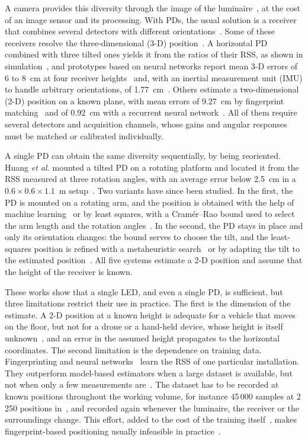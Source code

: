 A camera provides this diversity through the image of the luminaire~\cite{Hussain2022}, at the cost of an image sensor and its processing. With PDs, the usual solution is a receiver that combines several detectors with different orientations~\cite{Yang2014,Yu2018}. Some of these receivers resolve the three-dimensional (\mbox{3-D}) position~\cite{Yang2014}. A horizontal PD combined with three tilted ones yields it from the ratios of their RSS, as shown in simulation~\cite{Qin2020}, and prototypes based on neural networks report mean \mbox{3-D} errors of 6 to 8~cm at four receiver heights~\cite{Li2024} and, with an inertial measurement unit (IMU) to handle arbitrary orientations, of 1.77~cm~\cite{Ma2024}. Others estimate a two-dimensional (\mbox{2-D}) position on a known plane, with mean errors of 9.27~cm by fingerprint matching~\cite{Qin2021} and of 0.92~cm with a recurrent neural network~\cite{Chen2021}. All of them require several detectors and acquisition channels, whose gains and angular responses must be matched or calibrated individually.

A single PD can obtain the same diversity sequentially, by being reoriented. Huang \emph{et al.} mounted a tilted PD on a rotating platform and located it from the RSS measured at three rotation angles, with an average error below 2.5~cm in a $0.6\times0.6\times1.1$~m setup~\cite{Huang2015}. Two variants have since been studied. In the first, the PD is mounted on a rotating arm, and the position is obtained with the help of machine learning~\cite{Liu2022} or by least squares, with a Cram\'er--Rao bound used to select the arm length and the rotation angles~\cite{Shi2025}. In the second, the PD stays in place and only its orientation changes: the bound serves to choose the tilt, and the least-squares position is refined with a metaheuristic search~\cite{Wang2024} or by adapting the tilt to the estimated position~\cite{Shi2026}. All five systems estimate a \mbox{2-D} position and assume that the height of the receiver is known.

These works show that a single LED, and even a single PD, is sufficient, but three limitations restrict their use in practice. The first is the dimension of the estimate. A \mbox{2-D} position at a known height is adequate for a vehicle that moves on the floor, but not for a drone or a hand-held device, whose height is itself unknown~\cite{Plets2019,Bastiaens2026}, and an error in the assumed height propagates to the horizontal coordinates. The second limitation is the dependence on training data. Fingerprinting and neural networks~\cite{Qin2021,Chen2021,Li2024,Ma2024,Liu2022} learn the RSS of one particular installation. They outperform model-based estimators when a large dataset is available, but not when only a few measurements are~\cite{Glass2021}. The dataset has to be recorded at known positions throughout the working volume, for instance 45\,000 samples at 2\,250 positions in~\cite{Ma2024}, and recorded again whenever the luminaire, the receiver or the surroundings change. This effort, added to the cost of the training itself~\cite{Rekkas2023}, makes fingerprint-based positioning usually infeasible in practice~\cite{Bastiaens2026}.

